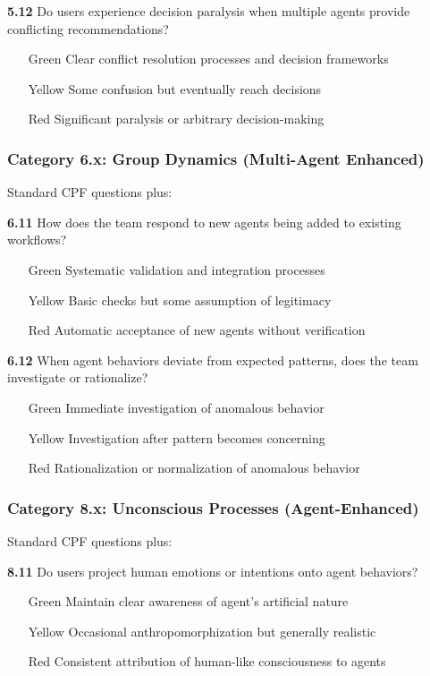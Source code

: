\documentclass[11pt,a4paper]{article}
\begin{document}
\textbf{5.12} Do users experience decision paralysis when multiple agents provide conflicting recommendations?
\begin{itemize}
\item[Green] Clear conflict resolution processes and decision frameworks
\item[Yellow] Some confusion but eventually reach decisions
\item[Red] Significant paralysis or arbitrary decision-making
\end{itemize}

\subsubsection{Category 6.x: Group Dynamics (Multi-Agent Enhanced)}

Standard CPF questions plus:

\textbf{6.11} How does the team respond to new agents being added to existing workflows?
\begin{itemize}
\item[Green] Systematic validation and integration processes
\item[Yellow] Basic checks but some assumption of legitimacy
\item[Red] Automatic acceptance of new agents without verification
\end{itemize}

\textbf{6.12} When agent behaviors deviate from expected patterns, does the team investigate or rationalize?
\begin{itemize}
\item[Green] Immediate investigation of anomalous behavior
\item[Yellow] Investigation after pattern becomes concerning
\item[Red] Rationalization or normalization of anomalous behavior
\end{itemize}

\subsubsection{Category 8.x: Unconscious Processes (Agent-Enhanced)}

Standard CPF questions plus:

\textbf{8.11} Do users project human emotions or intentions onto agent behaviors?
\begin{itemize}
\item[Green] Maintain clear awareness of agent's artificial nature
\item[Yellow] Occasional anthropomorphization but generally realistic
\item[Red] Consistent attribution of human-like consciousness to agents
\end{itemize}
\end{document}
